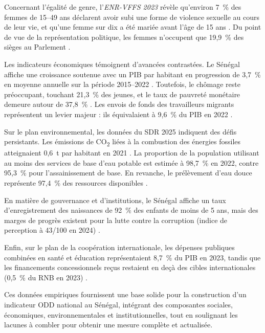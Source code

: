 Concernant l’égalité de genre, l’\textit{ENR-VFFS 2023} révèle qu’environ 7~\% des femmes de 15–49 ans déclarent avoir subi une forme de violence sexuelle au cours de leur vie, et qu’une femme sur dix a été mariée avant l’âge de 15 ans \autocite{ANSD_ENRVFFS_2023}. Du point de vue de la représentation politique, les femmes n’occupent que 19,9~\% des sièges au Parlement \autocite{SDR2025}.

Les indicateurs économiques témoignent d’avancées contrastées. Le Sénégal affiche une croissance soutenue avec un PIB par habitant en progression de 3,7~\% en moyenne annuelle sur la période 2015–2022 \autocite{BanqueMondiale2022}. Toutefois, le chômage reste préoccupant, touchant 21,3~\% des jeunes, et le taux de pauvreté monétaire demeure autour de 37,8~\% \autocite{ANSD_EHCVM_2018_2019}. Les envois de fonds des travailleurs migrants représentent un levier majeur : ils équivalaient à 9,6~\% du PIB en 2022 \autocite{BM_KNOMAD_2022}.

Sur le plan environnemental, les données du SDR 2025 indiquent des défis persistants. Les émissions de CO\textsubscript{2} liées à la combustion des énergies fossiles atteignaient 0,6~t par habitant en 2021 \autocite{SDR2025}. La proportion de la population utilisant au moins des services de base d’eau potable est estimée à 98,7~\% en 2022, contre 95,3~\% pour l’assainissement de base. En revanche, le prélèvement d’eau douce représente 97,4~\% des ressources disponibles \autocite{SDR2025}.

En matière de gouvernance et d’institutions, le Sénégal affiche un taux d’enregistrement des naissances de 92~\% des enfants de moins de 5 ans, mais des marges de progrès existent pour la lutte contre la corruption (indice de perception à 43/100 en 2024) \autocite{Transparency2024}.

Enfin, sur le plan de la coopération internationale, les dépenses publiques combinées en santé et éducation représentaient 8,7~\% du PIB en 2023, tandis que les financements concessionnels reçus restaient en deçà des cibles internationales (0,5~\% du RNB en 2023) \autocite{SDR2025}.

\bigskip
Ces données empiriques fournissent une base solide pour la construction d’un indicateur ODD national au Sénégal, intégrant des composantes sociales, économiques, environnementales et institutionnelles, tout en soulignant les lacunes à combler pour obtenir une mesure complète et actualisée.









